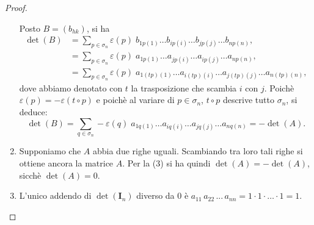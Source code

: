 \documentclass{article}
\theoremstyle{plain}
\theoremstyle{definition}
\theoremstyle{remark}
\begin{document}
\begin{proof}
\begin{enumerate}
        Posto $B=(b_{hk})$, si ha 
        \begin{align*}
            \det(B)&=\sum_{p\in\sigma_n}\varepsilon(p)\;b_{1p(1)}\dots b_{ip(i)}\dots b_{jp(j)}\dots b_{np(n)},\\
            &=\sum_{p\in\sigma_n}\varepsilon(p)\;a_{1p(1)}\dots a_{jp(i)}\dots a_{ip(j)}\dots a_{np(n)},\\
            &=\sum_{p\in\sigma_n}\varepsilon(p)\;a_{1(tp)(1)}\dots a_{i(tp)(i)}\dots a_{j(tp)(j)}\dots a_{n(tp)(n)},
        \end{align*}
        dove abbiamo denotato con $t$ la trasposizione che scambia $i$ con $j$. 
        Poichè $\varepsilon(p)=-\varepsilon(t\circ p)$ e poichè al variare di $p\in\sigma_n$, $t\circ p$ descrive tutto $\sigma_n$, si deduce:
        \[\det(B)=\sum_{q\in\sigma_n}-\varepsilon(q)\;a_{1q(1)}\dots a_{iq(i)}\dots a_{jq(j)} \dots a_{nq(n)}=-\det(A).\]
        \item Supponiamo che $A$ abbia due righe uguali. Scambiando tra loro tali righe si ottiene ancora la matrice $A$.
        Per la (3) si ha quindi $\det(A)=-\det(A)$, sicchè $\det(A)=0$.
        \item L'unico addendo di $\det(\mathbf{I}_n)$ diverso da $0$ è \(a_{11}\,a_{22}\,...\,a_{nn}=1\cdot1\cdot\ldots\cdot1=1\).
    \end{enumerate}
\end{proof}

\vspace{10pt}
\end{document}
